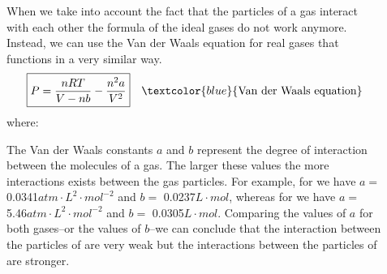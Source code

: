 \documentclass[main.tex]{subfiles}
\begin{document}
\begin{description}
\item[] 
When we take into account the fact that the particles of a gas interact with each other the formula of the ideal gases do not work anymore. Instead, we can use the Van der Waals equation for real gases that functions in a very similar way.
\begin{equation*}\begin{split}
\boxed{  P=\frac{nRT}{V-nb}-\frac{n^2a}{V^2}} \quad \textcolor{blue}{\text{Van der Waals equation}}
\end{split}\end{equation*}
where:


\item[] 
The Van der Waals constants $a$ and $b$ represent the degree of interaction between the molecules of a gas. The larger these values the more interactions exists between the gas particles. For example, for  we have $a=$ 0.0341$ atm\cdot L^2\cdot mol^{-2}$ and $b=$ 0.0237$L\cdot mol$, whereas for  we have $a=$ 5.46$ atm\cdot L^2\cdot mol^{-2}$ and $b=$ 0.0305$L\cdot mol$. Comparing the values of $a$ for both gases--or the values of $b$--we can conclude that the interaction between the particles of  are very weak but the interactions between the particles of  are stronger.


\end{description}
\end{document}
